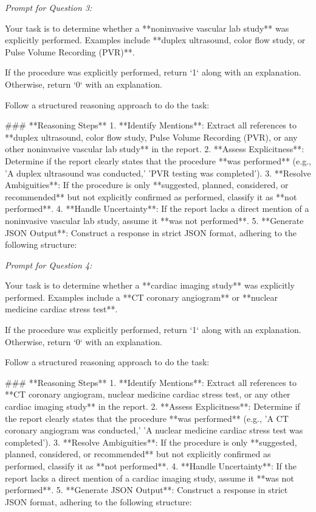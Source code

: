 \textit{\normalsize Prompt for Question  3:}
\begin{mdframed}[]
\normalsize

Your task is to determine whether a **noninvasive vascular lab study** was explicitly performed. Examples include **duplex ultrasound, color flow study, or Pulse Volume Recording (PVR)**. 

If the procedure was explicitly performed, return `1` along with an explanation. Otherwise, return `0` with an explanation.

Follow a structured reasoning approach to do the task:

### **Reasoning Steps**  
1. **Identify Mentions**: Extract all references to **duplex ultrasound, color flow study, Pulse Volume Recording (PVR), or any other noninvasive vascular lab study** in the report.  
2. **Assess Explicitness**: Determine if the report clearly states that the procedure **was performed** (e.g., 'A duplex ultrasound was conducted,' 'PVR testing was completed').  
3. **Resolve Ambiguities**: If the procedure is only **suggested, planned, considered, or recommended** but not explicitly confirmed as performed, classify it as **not performed**.  
4. **Handle Uncertainty**: If the report lacks a direct mention of a noninvasive vascular lab study, assume it **was not performed**.  
5. **Generate JSON Output**: Construct a response in strict JSON format, adhering to the following structure:  

\end{mdframed}

\textit{\normalsize Prompt for Question  4:}
\begin{mdframed}[]
\normalsize

Your task is to determine whether a **cardiac imaging study** was explicitly performed. Examples include a **CT coronary angiogram** or **nuclear medicine cardiac stress test**. 

If the procedure was explicitly performed, return `1` along with an explanation. Otherwise, return `0` with an explanation.

Follow a structured reasoning approach to do the task:

### **Reasoning Steps**  
1. **Identify Mentions**: Extract all references to **CT coronary angiogram, nuclear medicine cardiac stress test, or any other cardiac imaging study** in the report.  
2. **Assess Explicitness**: Determine if the report clearly states that the procedure **was performed** (e.g., 'A CT coronary angiogram was conducted,' 'A nuclear medicine cardiac stress test was completed').  
3. **Resolve Ambiguities**: If the procedure is only **suggested, planned, considered, or recommended** but not explicitly confirmed as performed, classify it as **not performed**.  
4. **Handle Uncertainty**: If the report lacks a direct mention of a cardiac imaging study, assume it **was not performed**.  
5. **Generate JSON Output**: Construct a response in strict JSON format, adhering to the following structure:  
\end{mdframed}

